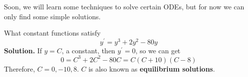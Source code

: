 Soon, we will learn some techniques to solve certain ODEs, but for now we can
only find some simple solutions.

\begin{Example}{}{}
    What constant functions satisfy
    \[ y^\prime=y^3+2y^2-80y \]
    \textbf{Solution.} If $ y=C $, a constant, then $ y^\prime=0 $, so we can get
    \[ 0=C^3+2C^2-80C=C(C+10)(C-8) \]
    Therefore, $ C=0,-10,8 $. $ C $ is also known as \textbf{equilibrium solutions}.
\end{Example}
